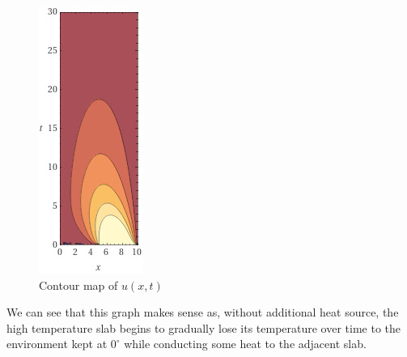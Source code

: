 \documentclass{article}
\numberwithin{equation}{section}
\begin{document}
\begin{figure}[!htb]
\begin{minipage}{0.48\textwidth}
     \includegraphics[width=.7\linewidth]{plot3.2.jpg}
     \caption{Contour map of $u(x,t)$}\label{Fig: 3.2}
   \end{minipage}
\end{figure}

We can see that this graph makes sense as, without additional heat source, the high temperature slab begins to gradually lose its temperature over time to the environment kept at $0^\circ$ while conducting some heat to the adjacent slab.
\end{document}
